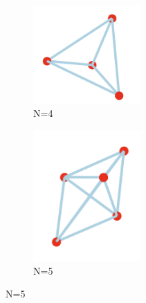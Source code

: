 \documentclass[11pt,onecolumn]{article}
\begin{document}
\begin{figure}[h]
  \centering
  \begin{subfigure}[b]{0.45\textwidth}
    \centering
    \includegraphics[width=0.45\textwidth]{N4.png}
    \caption{N=4}
    \label{fig:sub1}
  \end{subfigure}
  \hfill
  \begin{subfigure}[b]{0.45\textwidth}
    \centering
    \includegraphics[width=0.45\textwidth]{N5.png}
    \caption{N=5}
    \label{fig:sub2}
  \end{subfigure}

  \vspace{1em}


\end{figure}
\end{document}
